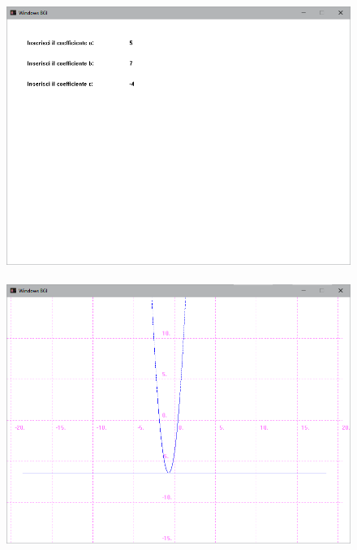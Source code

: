 \documentclass[12pt]{book}
\begin{document}
\begin{figure}[h]
	\includegraphics[scale=0.5]{tracciaparabolaterminale1}
 \\ \\ 
	\includegraphics[scale=0.5]{tracciaparabolaterminale2}
\end{figure}
\clearpage
\newpage
\end{document}
